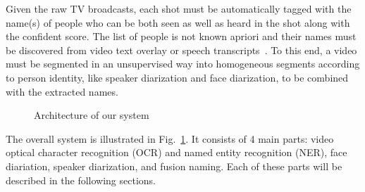 Given the raw TV broadcasts, each shot must be automatically tagged with the name(s) of people who can be both seen as well as heard in the shot along with the confident score. The list of people is not known apriori and their names must be discovered from video text overlay or speech transcripts~\cite{bredin2016mediaeval}. 
%
To this end, a video must be segmented in an unsupervised way into homogeneous segments according to person identity, like  speaker diarization and face diarization, to be combined with the extracted names.
%

\begin{figure}[tb]
\centering
{}
\vspace*{-3mm}
\caption{Architecture of our system}
\vspace*{-3mm}
\label{fig:pipeline}
\end{figure}

The overall system is illustrated in Fig.~\ref{fig:pipeline}. It consists of  4 main parts: video optical character recognition (OCR) and named entity recognition (NER), face diariation, speaker diarization, and fusion naming. Each of these parts will be described in the following sections.

\endinput
